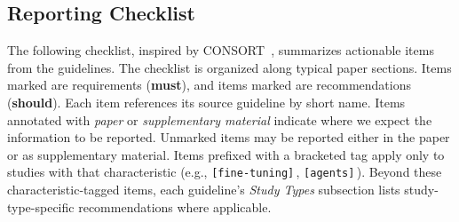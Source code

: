 \documentclass[smallextended]{svjour3}
\makeatletter
\newif\ifpaper\papertrue
\newcommand{\must}{\textbf{must}\xspace}
\newcommand{\mustnot}{\textbf{must not}\xspace}
\newcommand{\should}{\textbf{should}\xspace}
\newcommand{\paper}{\emph{paper}\xspace}
\newcommand{\supplementarymaterial}{\emph{supplementary material}\xspace}
\newcommand{\paper}{\emph{paper}\xspace}
\newcommand{\supplementarymaterial}{\emph{supplementary material}\xspace}
\newcommand{\iconM}{\usebox{\iconMbox}\xspace}
\newcommand{\iconS}{\usebox{\iconSbox}\xspace}
\newcommand{\iconM}{●\xspace}
\newcommand{\iconS}{○\xspace}
\newcommand{\condition}[1]{\texttt{\small[#1]}\,}
\newcommand{\condition}[1]{@@cond:#1@@}
\makeatother
\begin{document}
\begin{appendices}
\section{Reporting Checklist}
\label{sec:checklist}


The following checklist, inspired by CONSORT~\citep{Schulz2010}, summarizes actionable items from the guidelines.
The checklist is organized along typical paper sections.
Items marked \iconM are requirements (\must), and items marked \iconS are recommendations (\should).
Each item references its source guideline by short name.
Items annotated with \paper or \supplementarymaterial indicate where we expect the information to be reported.
Unmarked items may be reported either in the paper or as supplementary material.
Items prefixed with a bracketed tag apply only to studies with that characteristic (e.g., \condition{fine-tuning}, \condition{agents}).\ifpaper\else{} Readers can hover each tag to read its description and use the filter panel to hide items that do not apply to their study.\fi
Beyond these characteristic-tagged items, each guideline's \emph{Study Types} subsection lists study-type-specific recommendations where applicable.


\end{appendices}
\end{document}
